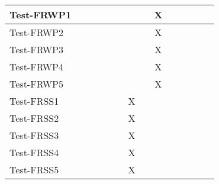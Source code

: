 \documentclass[12pt, titlepage]{article}
\begin{document}
\begin{table}[H]
\begin{adjustwidth}{-0.3in}{-0.5in}
{\begin{tabular}{c|c|c|c|c|c|c|c|c|c|c|c|c|c|}
\multicolumn{1}{|l|}{{Test-FRWP1}}   &             &             &             &             &             &             &                          &        X      &              &              &             &  &                    \\ \hline
\multicolumn{1}{|l|}{{Test-FRWP2}}   &             &             &             &             &             &             &                          &      X        &              &              &             &  &                    \\ \hline
\multicolumn{1}{|l|}{{Test-FRWP3}}   &             &             &            &             &             &             &                          &      X        &              &              &             &  &                    \\ \hline
\multicolumn{1}{|l|}{{Test-FRWP4}}   &             &             &             &             &             &             &                          &      X        &              &              &             &  &                    \\ \hline
\multicolumn{1}{|l|}{{Test-FRWP5}}   &             &             &             &             &             &             &                          &      X        &              &              &             &  &                    \\ \hline
\multicolumn{1}{|l|}{{Test-FRSS1}}   &             &             &             &             &             &       X      &                          &              &              &              &             &  &                    \\ \hline
\multicolumn{1}{|l|}{{Test-FRSS2}}   &             &             &             &             &             &     X        &                          &              &              &              &             &  &                    \\ \hline
\multicolumn{1}{|l|}{{Test-FRSS3}}   &             &             &             &             &             &    X         &                          &              &              &              &             &  &                    \\ \hline
\multicolumn{1}{|l|}{{Test-FRSS4}}   &             &             &             &             &             &    X         &                          &              &              &              &             &  &                    \\ \hline
\multicolumn{1}{|l|}{{Test-FRSS5}}   &             &             &             &             &             &      X       &                          &              &              &              &             &  &                    \\ \hline

\end{tabular}}
\end{adjustwidth}
\end{table}
\end{document}
